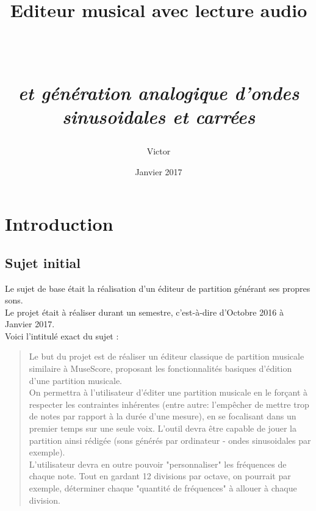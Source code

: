 \documentclass[12pt]{report}
\begin{document}
\title{\begin{Huge}Editeur musical avec lecture audio\end{Huge} \\
    \begin{normalsize}\textit{et génération analogique d'ondes sinusoidales et carrées}\end{normalsize}
    }
\author{Victor }
\date{Janvier 2017}
 
\maketitle
{}
\tableofcontents

\chapter{Introduction}
\section{Sujet initial}
Le sujet de base était la réalisation d'un éditeur de partition générant ses propres sons.\\
Le projet était à réaliser durant un semestre, c'est-à-dire d'Octobre 2016 à Janvier 2017. \\
Voici l'intitulé exact du sujet :\\
\begin{mdframed}[backgroundcolor=grey]
 


\begin{quotation}
Le but du projet est de réaliser un éditeur classique de partition
musicale similaire à MuseScore, proposant les
fonctionnalités basiques d'édition d'une partition musicale.\\
On permettra à l'utilisateur d'éditer une partition musicale en le
forçant à respecter les contraintes inhérentes (entre autre: l'empêcher
de mettre trop de notes par rapport à la durée d'une mesure), en se
focalisant dans un premier temps sur une seule voix. L'outil devra être
capable de jouer la partition ainsi rédigée (sons générés par ordinateur
- ondes sinusoidales par exemple).\\
L'utilisateur devra en outre pouvoir "personnaliser" les fréquences de
chaque note. Tout en gardant 12 divisions par octave, on pourrait par
exemple, déterminer chaque "quantité de fréquences" à allouer à chaque
division.
\end{quotation}
\end{mdframed}
\vskip 0.3in
\end{document}
